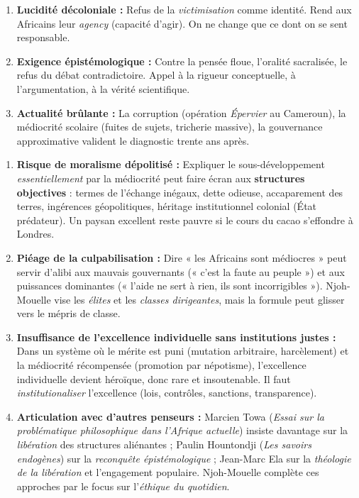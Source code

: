 \documentclass[11pt]{article}
\begin{document}
\begin{propriete}
\begin{enumerate}
\item \textbf{Lucidité décoloniale :} Refus de la \emph{victimisation} comme identité. Rend aux Africains leur \emph{agency} (capacité d'agir). On ne change que ce dont on se sent responsable.
\item \textbf{Exigence épistémologique :} Contre la pensée floue, l'oralité sacralisée, le refus du débat contradictoire. Appel à la rigueur conceptuelle, à l'argumentation, à la vérité scientifique.
\item \textbf{Actualité brûlante :} La corruption (opération \emph{Épervier} au Cameroun), la médiocrité scolaire (fuites de sujets, tricherie massive), la gouvernance approximative valident le diagnostic trente ans après.
\end{enumerate}
\end{propriete}

\begin{propriete}
\begin{enumerate}
\item \textbf{Risque de moralisme dépolitisé :} Expliquer le sous-développement \emph{essentiellement} par la médiocrité peut faire écran aux \textbf{structures objectives} : termes de l'échange inégaux, dette odieuse, accaparement des terres, ingérences géopolitiques, héritage institutionnel colonial (État prédateur). Un paysan excellent reste pauvre si le cours du cacao s'effondre à Londres.
\item \textbf{Piéage de la culpabilisation :} Dire « les Africains sont médiocres » peut servir d'alibi aux mauvais gouvernants (« c'est la faute au peuple ») et aux puissances dominantes (« l'aide ne sert à rien, ils sont incorrigibles »). Njoh-Mouelle vise les \emph{élites} et les \emph{classes dirigeantes}, mais la formule peut glisser vers le mépris de classe.
\item \textbf{Insuffisance de l'excellence individuelle sans institutions justes :} Dans un système où le mérite est puni (mutation arbitraire, harcèlement) et la médiocrité récompensée (promotion par népotisme), l'excellence individuelle devient héroïque, donc rare et insoutenable. Il faut \emph{institutionaliser} l'excellence (lois, contrôles, sanctions, transparence).
\item \textbf{Articulation avec d'autres penseurs :} Marcien Towa (\emph{Essai sur la problématique philosophique dans l'Afrique actuelle}) insiste davantage sur la \emph{libération} des structures aliénantes ; Paulin Hountondji (\emph{Les savoirs endogènes}) sur la \emph{reconquête épistémologique} ; Jean-Marc Ela sur la \emph{théologie de la libération} et l'engagement populaire. Njoh-Mouelle complète ces approches par le focus sur l'\emph{éthique du quotidien}.
\end{enumerate}
\end{propriete}
\end{document}
